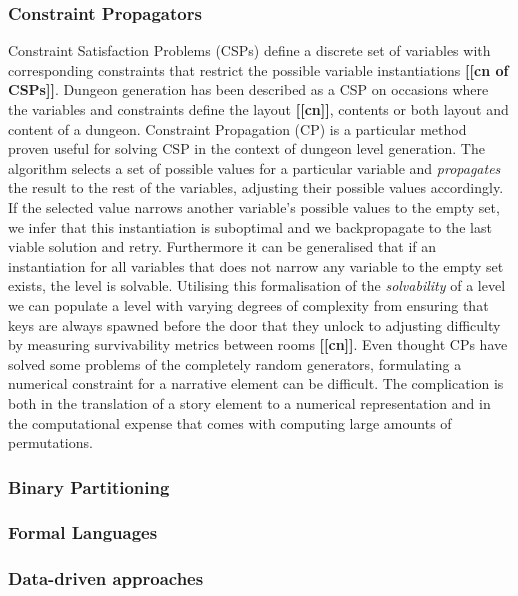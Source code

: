 \documentclass{UoYCSproject}
\begin{document}
\subsubsection{Constraint Propagators}
Constraint Satisfaction Problems (CSPs) define a discrete set of variables with corresponding constraints that restrict the possible variable instantiations \textbf{[[cn  of CSPs]]}. Dungeon generation has been described as a CSP on occasions where the variables and constraints define the layout \textbf{[[cn]]}, contents \parencite{HorswillCSPMission} or both layout and content \parencite{GreenCSPboth} of a dungeon. Constraint Propagation (CP) is a particular method proven useful for solving CSP in the context of dungeon level generation. The algorithm selects a set of possible values for a particular variable and \textit{propagates} the result to the rest of the variables, adjusting their possible values accordingly. If the selected value narrows another variable's possible values to the empty set, we infer that this instantiation is suboptimal and we backpropagate to the last viable solution and retry. Furthermore it can be generalised that if an instantiation for all variables that does not narrow any variable to the empty set exists, the level is solvable. Utilising this formalisation of the \textit{solvability} of a level we can populate a level with varying degrees of complexity from ensuring that keys are always spawned before the door that they unlock to adjusting difficulty by measuring survivability metrics between rooms \textbf{[[cn]]}. Even thought CPs have solved some problems of the completely random generators, formulating a numerical constraint for a narrative element can be difficult. The complication is both in the translation of a story element to a numerical representation and in the computational expense that comes with computing large amounts of permutations.

\subsubsection{Binary Partitioning}
\subsubsection{Formal Languages}
\subsubsection{Data-driven approaches}
\end{document}

